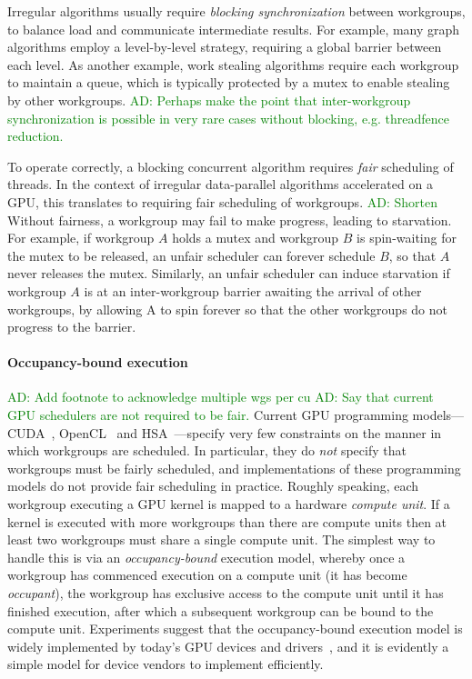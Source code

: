 \documentclass[nocopyrightspace]{sigplanconf-pldi16}
\newcommand{\ADComment}[1]{\textcolor{green}{AD: #1}}
\begin{document}
Irregular algorithms usually require \emph{blocking synchronization}
between workgroups, to balance load and communicate intermediate
results.  For example, many graph algorithms employ a level-by-level strategy, requiring a global barrier between each level.
As another example, work stealing algorithms require each workgroup
to maintain a queue, which is typically protected by a mutex to enable
stealing by other workgroups.  \ADComment{Perhaps
  make the point that inter-workgroup synchronization is possible in
  very rare cases without blocking, e.g. threadfence reduction.}

To operate correctly, a blocking concurrent algorithm requires
\emph{fair} scheduling of threads.  In the context of irregular
data-parallel algorithms accelerated on a GPU, this translates to
requiring fair scheduling of workgroups.  \ADComment{Shorten} Without fairness, a
workgroup may fail to make progress, leading to starvation.  For
example, if workgroup $A$ holds a mutex and workgroup $B$ is
spin-waiting for the mutex to be released, an unfair scheduler can
forever schedule $B$, so that $A$ never releases the mutex.
Similarly, an unfair scheduler can induce starvation if workgroup $A$
is at an inter-workgroup barrier awaiting the arrival of other
workgroups, by allowing A to spin forever so that the other workgroups
do not progress to the barrier.

\paragraph{Occupancy-bound execution}
\ADComment{Add footnote to acknowledge multiple wgs per cu}
\ADComment{Say that current GPU schedulers are not required to be fair.}
Current GPU programming models---CUDA~\cite{...}, OpenCL~\cite{...}
and HSA~\cite{...}---specify very few constraints on the manner in
which workgroups are scheduled.  In particular, they do \emph{not}
specify that workgroups must be fairly scheduled, and implementations
of these programming models do not provide fair scheduling in
practice.  Roughly speaking, each workgroup executing a GPU kernel is
mapped to a hardware \emph{compute unit}.  If a kernel is executed
with more workgroups than there are compute units then at least two
workgroups must share a single compute unit.  The simplest way to
handle this is via an \emph{occupancy-bound} execution model, whereby
once a workgroup has commenced execution on a compute unit (it has
become \emph{occupant}), the workgroup has exclusive access to the
compute unit until it has finished execution, after which a subsequent
workgroup can be bound to the compute unit.  Experiments suggest that
the occupancy-bound execution model is widely implemented by today's
GPU devices and drivers~\cite{...}, and it is evidently a simple model
for device vendors to implement efficiently.
\end{document}
